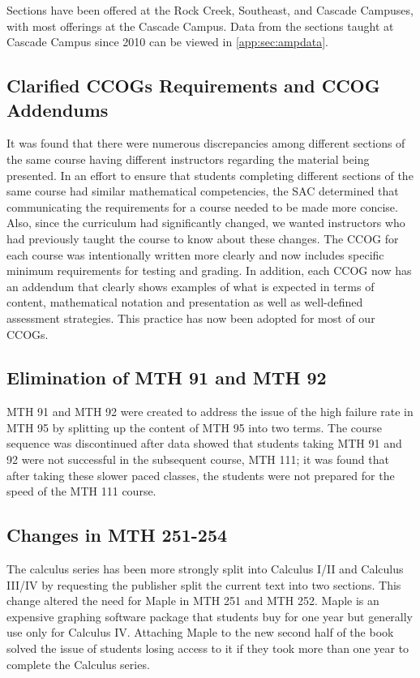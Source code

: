 Sections have been offered at the Rock Creek, Southeast, and Cascade Campuses,
with most offerings at the Cascade Campus.  Data from the sections taught at
Cascade Campus since 2010 can be viewed in \vref{app:sec:ampdata}.
 
\subsection{Clarified CCOGs Requirements and CCOG Addendums}
It was found that there were numerous discrepancies among different sections of
the same course having different instructors regarding the material being
presented. In an effort to ensure that students completing different sections of
the same course had similar mathematical competencies, the SAC determined that
communicating the requirements for a course needed to be made more concise.
Also, since the curriculum had significantly changed, we wanted instructors who
had previously taught the course to know about these changes.  The CCOG for each
course was intentionally written more clearly and now includes specific minimum
requirements for testing and grading.  In addition, each CCOG now has an
addendum that clearly shows examples of what is expected in terms of content,
mathematical notation and presentation as well as well-defined assessment
strategies.  This practice has now been adopted for most of our CCOGs.
 
\subsection{Elimination of MTH 91 and MTH 92}
MTH 91 and MTH 92 were created to address the issue of the high failure rate in
MTH 95 by splitting up the content of MTH 95 into two terms.  The course
sequence was discontinued after data showed that students taking MTH 91 and 92
were not successful in the subsequent course, MTH 111; it was found that after
taking these slower paced classes, the students were not prepared for the speed
of the MTH 111 course.
 
\subsection{Changes in MTH 251-254}
The calculus series has been more strongly split into Calculus I/II and Calculus
III/IV by requesting the publisher split the current text into two sections.
This change altered the need for Maple in MTH 251 and MTH 252.  Maple is an
expensive graphing software package that students buy for one year but generally
use only for Calculus IV. Attaching Maple to the new second half of the book
solved the issue of students losing access to it if they took more than one year
to complete the Calculus series.

